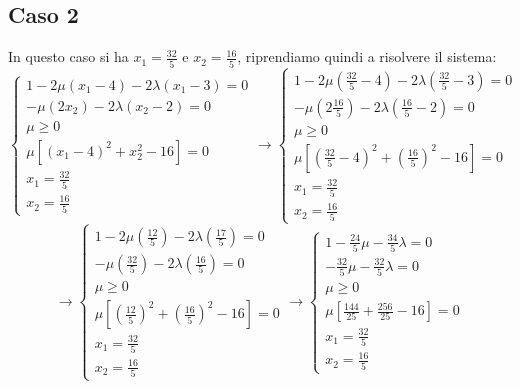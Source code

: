 \documentclass[a4paper,12pt, oneside]{book}
\begin{document}
\subsection{Caso 2}
In questo caso si ha $x_1=\frac{32}{5}$ e $x_2=\frac{16}{5}$,
riprendiamo quindi a risolvere il sistema:
\[\begin{cases}
    1-2\mu(x_1-4)-2\lambda(x_1-3)=0\\
    -\mu(2x_2)-2\lambda(x_2-2)=0\\
    \mu\geq 0\\
    \mu[(x_1-4)^2+x_2^2-16]=0\\
    x_1=\frac{32}{5} \\
    x_2=\frac{16}{5}
  \end{cases}\to
  \begin{cases}
    1-2\mu(\frac{32}{5}-4)-2\lambda(\frac{32}{5}-3)=0\\
    -\mu(2\frac{16}{5})-2\lambda(\frac{16}{5}-2)=0\\
    \mu\geq 0\\
    \mu[(\frac{32}{5}-4)^2+\left(\frac{16}{5}\right)^2-16]=0\\
    x_1=\frac{32}{5} \\
    x_2=\frac{16}{5}
  \end{cases}
\]
\[\to
  \begin{cases}
    1-2\mu(\frac{12}{5})-2\lambda(\frac{17}{5})=0\\
    -\mu(\frac{32}{5})-2\lambda(\frac{16}{5})=0\\
    \mu\geq 0\\
    \mu[(\frac{12}{5})^2+\left(\frac{16}{5}\right)^2-16]=0\\
    x_1=\frac{32}{5} \\
    x_2=\frac{16}{5}
  \end{cases}\to
  \begin{cases}
    1-\frac{24}{5}\mu-\frac{34}{5}\lambda=0\\
    -\frac{32}{5}\mu-\frac{32}{5}\lambda=0\\
    \mu\geq 0\\
    \mu[\frac{144}{25}+\frac{256}{25}-16]=0\\
    x_1=\frac{32}{5} \\
    x_2=\frac{16}{5}
  \end{cases}
\]
\end{document}

